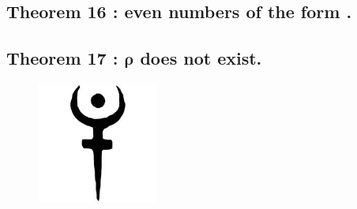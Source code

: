 \documentclass[preview]{standalone}
\begin{document}
\subsection[\texorpdfstring{Even numbers of the form $3 \gamma + 2$}
        {Even numbers of the form $3 gamma + 2$}
    ]{
        \color{section} Theorem 16 \color{black} : even numbers of the form .
    }

\pagebreak


\subsection[\texorpdfstring{$\rho$ does not exist.}
        {Rho does not exist.}
    ]{
        \color{section} Theorem 17 \color{black} : $\bm{\rho}$ does not exist.
    }

\vspace{1\baselineskip}
\begin{figure}[h!]
    \centering
    \includegraphics[width=4cm]{../resources/jpg/1.6.introduction.to.proofs/hades.jpg}
\end{figure} 
\pagebreak
\thispagestyle{empty}
\end{document}
